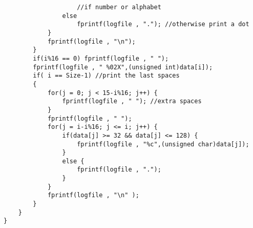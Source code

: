 \begin{verbatim}
                    //if number or alphabet
                else
                    fprintf(logfile , "."); //otherwise print a dot
            }
            fprintf(logfile , "\n");
        }
        if(i%16 == 0) fprintf(logfile , " ");
        fprintf(logfile , " %02X",(unsigned int)data[i]);
        if( i == Size-1) //print the last spaces
        {
            for(j = 0; j < 15-i%16; j++) {
                fprintf(logfile , " "); //extra spaces
            }
            fprintf(logfile , " ");
            for(j = i-i%16; j <= i; j++) {
                if(data[j] >= 32 && data[j] <= 128) {
                    fprintf(logfile , "%c",(unsigned char)data[j]);
                }
                else {
                    fprintf(logfile , ".");
                }
            }
            fprintf(logfile , "\n" );
        }
    }
}
\end{verbatim}